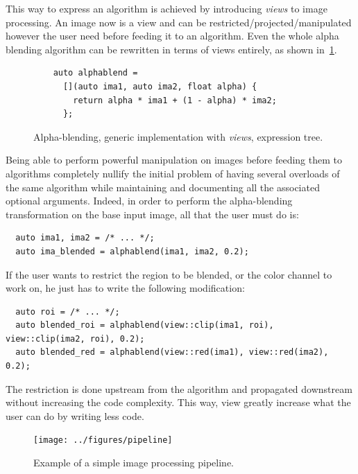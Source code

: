 This way to express an algorithm is achieved by introducing \emph{views} to image processing. An image now is a view and
can be restricted/projected/manipulated however the user need before feeding it to an algorithm. Even the whole alpha
blending algorithm can be rewritten in terms of views entirely, as shown in~\cref{summary:fig:new.alphablend}.

\begin{figure}[htbp]
  \centering
  \begin{minipage}[b]{5.5cm}
    
  \end{minipage}
  \begin{minipage}[b]{5.5cm}
    \begin{verbatim}
    auto alphablend =
      [](auto ima1, auto ima2, float alpha) {
        return alpha * ima1 + (1 - alpha) * ima2;
      };
    \end{verbatim}
    \bigskip
    \bigskip
    \bigskip
  \end{minipage}
  \caption[]{Alpha-blending, generic implementation with \emph{views}, expression tree.}
  \label{summary:fig:new.alphablend}
\end{figure}

Being able to perform powerful manipulation on images before feeding them to algorithms completely nullify the initial
problem of having several overloads of the same algorithm while maintaining and documenting all the associated optional
arguments. Indeed, in order to perform the alpha-blending transformation on the base input image, all that the user must
do is:
\begin{verbatim}
  auto ima1, ima2 = /* ... */;
  auto ima_blended = alphablend(ima1, ima2, 0.2);
\end{verbatim}
If the user wants to restrict the region to be blended, or the color channel to work on, he just has to write the
following modification:
\begin{verbatim}
  auto roi = /* ... */;
  auto blended_roi = alphablend(view::clip(ima1, roi), view::clip(ima2, roi), 0.2);
  auto blended_red = alphablend(view::red(ima1), view::red(ima2), 0.2);
\end{verbatim}
The restriction is done upstream from the algorithm and propagated downstream without increasing the code complexity.
This way, view greatly increase what the user can do by writing less code.

\begin{figure}[htbp]
  \centering
  \texttt{[image: ../figures/pipeline]}
  \caption[]{Example of a simple image processing pipeline.}
  \label{summary:fig:view.pipeline}
\end{figure}

